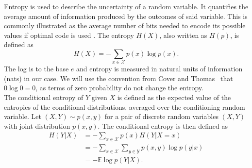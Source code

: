 Entropy is used to describe the uncertainty of a random variable. It quantifies the average amount of information produced by the outcomes of said variable. This is commonly illustrated as the average number of bits needed to encode its possible values if optimal code is used \cite{Goodfellow-et-al-2016}.
The entropy $H(X)$, also written as $H(p)$, is defined as
\begin{equation}
    H(X) = -\sum_{x \in \mathcal{X}} p(x) \log p(x).
\end{equation}
The log is to the base $e$ and entropy is measured in natural units of information (nats) in our case. We will use the convention from Cover and Thomas~\cite{Cover2005} that $0 \log 0 = 0$, as terms of zero probability do not change the entropy. %
\\
The conditional entropy of $Y$ given $X$ is defined as the expected value of the entropies of the conditional distributions, averaged over the conditioning random variable. Let $(X,Y) \sim p(x,y)$ for a pair of discrete random variables $(X,Y)$ with joint distribution $p(x,y)$. The conditional entropy is then defined as
\begin{align}
    H(Y|X)&= -\sum_{x \in \mathcal{X}} p(x) H(Y|X=x) \nonumber \\
    &= - \sum_{x \in \mathcal{X}} \sum_{y \in \mathcal{Y}}p(x,y) \log p(y|x) \nonumber \\
    &= -\mathbb{E} \log p(Y|X). \label{eq:cond_ent}
\end{align}

